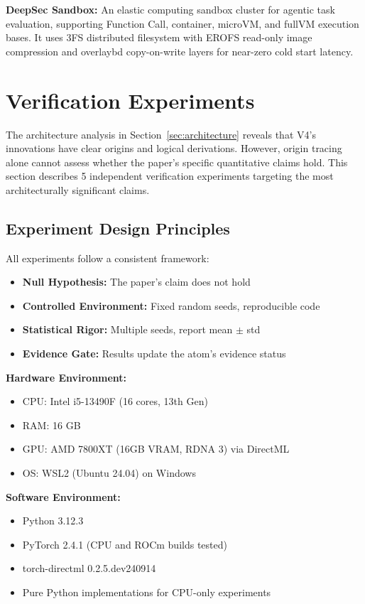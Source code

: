 \documentclass[11pt,a4paper]{article}
\begin{document}
\textbf{DeepSec Sandbox:} An elastic computing sandbox cluster for agentic task evaluation, supporting Function Call, container, microVM, and fullVM execution bases. It uses 3FS distributed filesystem with EROFS read-only image compression and overlaybd copy-on-write layers for near-zero cold start latency.

\section{Verification Experiments}
\label{sec:experiments}

The architecture analysis in Section~\ref{sec:architecture} reveals that V4's innovations have clear origins and logical derivations. However, origin tracing alone cannot assess whether the paper's specific quantitative claims hold. This section describes 5 independent verification experiments targeting the most architecturally significant claims.

\subsection{Experiment Design Principles}

All experiments follow a consistent framework:
\begin{itemize}
    \item \textbf{Null Hypothesis:} The paper's claim does not hold
    \item \textbf{Controlled Environment:} Fixed random seeds, reproducible code
    \item \textbf{Statistical Rigor:} Multiple seeds, report mean $\pm$ std
    \item \textbf{Evidence Gate:} Results update the atom's evidence status
\end{itemize}

\textbf{Hardware Environment:}
\begin{itemize}
    \item CPU: Intel i5-13490F (16 cores, 13th Gen)
    \item RAM: 16 GB
    \item GPU: AMD 7800XT (16GB VRAM, RDNA 3) via DirectML
    \item OS: WSL2 (Ubuntu 24.04) on Windows
\end{itemize}

\textbf{Software Environment:}
\begin{itemize}
    \item Python 3.12.3
    \item PyTorch 2.4.1 (CPU and ROCm builds tested)
    \item torch-directml 0.2.5.dev240914
    \item Pure Python implementations for CPU-only experiments
\end{itemize}
\end{document}
